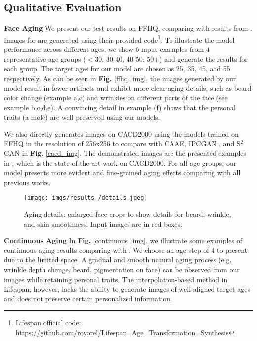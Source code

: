 \documentclass[final]{cvpr}
\begin{document}
\subsection{Qualitative Evaluation}


\textbf{Face Aging}
We present our test results on FFHQ, comparing with results from \cite{orel2020lifespan}. Images for \cite{orel2020lifespan} are generated using their provided code\footnote{Lifespan official code: \url{https://github.com/royorel/Lifespan_Age_Transformation_Synthesis}}. To illustrate the model performance across different ages, we show 6 input examples from 4 representative age groups (\(<\)30, 30-40, 40-50, 50+) and generate the results for each group. The target ages for our model are chosen as 25, 35, 45, and 55 respectively. As can be seen in \textbf{Fig.} \ref{ffhq_img}, the images generated by our model result in fewer artifacts and exhibit more clear aging details, such as beard color change (example a,c) and wrinkles on different parts of the face (see example b,c,d,e). A convincing detail in example (f) shows that the personal traits (a mole) are well preserved using our models.

We also directly generates images on CACD2000 using the models trained on FFHQ in the resolution of 256x256 to compare with CAAE\cite{zhang2017age}, IPCGAN \cite{wang2018face}, and S\(^2\)GAN \cite{he2019s2gan} in \textbf{Fig.} \ref{cacd_img}. The demonstrated images are the presented examples in \cite{he2019attgan}, which is the state-of-the-art work on CACD2000. For all age groups, our model presents more evident and fine-grained aging effects comparing with all previous works. 


\begin{figure}[h]
\centering
\vspace{-0.2cm}
\texttt{[image: imgs/results\_/details.jpeg]}
\caption{Aging details: enlarged face crops to show details for beard, wrinkle, and skin smoothness. Input images are in red boxes.}
\label{details_img}
\vspace{-0.2cm}
\end{figure}

\textbf{Continuous Aging}
In \textbf{Fig.} \ref{continuous_img}, we illustrate some examples of continuous aging results comparing with \cite{orel2020lifespan}. We choose an age step of 4 to present due to the limited space. A gradual and smooth natural aging process (e.g. wrinkle depth change, beard, pigmentation on face) can be observed from our images while retaining personal traits. The interpolation-based method in Lifespan, however, lacks the ability to generate images of well-aligned target ages and does not preserve certain personalized information.
\end{document}
